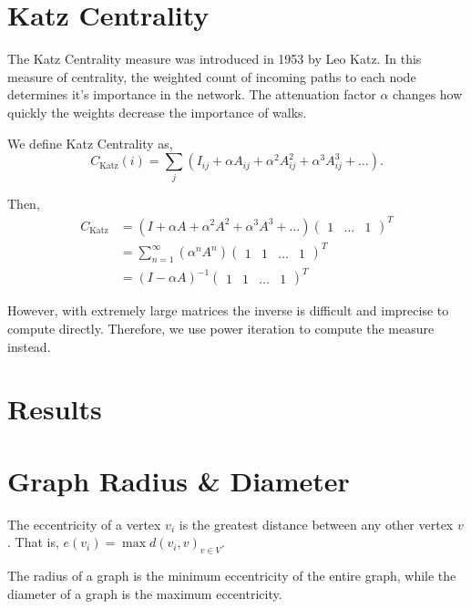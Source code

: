\documentclass{article}
\begin{document}
\section{Katz Centrality}

The Katz Centrality measure was introduced in 1953 by Leo Katz. 
In this measure of centrality, the weighted count of incoming paths to each node determines it's importance in the network. The attenuation factor $\alpha$ changes how quickly the weights decrease the importance of walks.

We define Katz Centrality as,
\begin{equation*}
    C_{\textrm{Katz}}(i) = \sum_{j} (I_{ij} + \alpha A_{ij} + \alpha^2 A_{ij}^2 + \alpha^3 A_{ij}^3 + \dots).
\end{equation*}

Then,
\begin{align*}
    C_{\textrm{Katz}} &= (I + \alpha A + \alpha^2 A^2 + \alpha^3 A^3 + \dots) \begin{pmatrix}
        1 & \dots & 1
    \end{pmatrix}^T \\
    &= \sum^\infty_{n=1} (\alpha^n A^n)\begin{pmatrix}
    1 & 1 & \dots & 1
\end{pmatrix}^T \\ 
&= (I - \alpha A)^{-1} \begin{pmatrix}
    1 & 1 & \dots & 1
\end{pmatrix}^T 
\end{align*}

However, with extremely large matrices the inverse is difficult and imprecise to compute directly.
Therefore, we use power iteration to compute the measure instead.

\section*{Results}

\section{Graph Radius \& Diameter}

The eccentricity of a vertex $v_i$ is the greatest distance between any other vertex $v$. That is, $e(v_i) = \max d(v_i, v)_{v \in V}$.

The radius of a graph is the minimum eccentricity of the entire graph, while the diameter of a graph is the maximum eccentricity.
\end{document}
